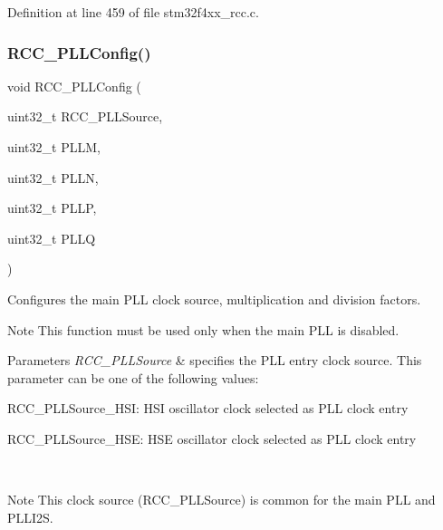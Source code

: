 Definition at line 459 of file stm32f4xx\+\_\+rcc.\+c.

\mbox{\label{group___r_c_c___group1_ga154b93e90bfdede2a874244a1ff1002e}} 
\subsubsection{\texorpdfstring{R\+C\+C\+\_\+\+P\+L\+L\+Config()}{RCC\_PLLConfig()}}
{\footnotesize\ttfamily void R\+C\+C\+\_\+\+P\+L\+L\+Config (\begin{DoxyParamCaption}\item[{uint32\+\_\+t}]{R\+C\+C\+\_\+\+P\+L\+L\+Source,  }\item[{uint32\+\_\+t}]{P\+L\+LM,  }\item[{uint32\+\_\+t}]{P\+L\+LN,  }\item[{uint32\+\_\+t}]{P\+L\+LP,  }\item[{uint32\+\_\+t}]{P\+L\+LQ }\end{DoxyParamCaption})}



Configures the main P\+LL clock source, multiplication and division factors. 

\begin{DoxyNote}{Note}
This function must be used only when the main P\+LL is disabled.
\end{DoxyNote}

\begin{DoxyParams}{Parameters}
{\em R\+C\+C\+\_\+\+P\+L\+L\+Source} & specifies the P\+LL entry clock source. This parameter can be one of the following values\+: \begin{DoxyItemize}
\item R\+C\+C\+\_\+\+P\+L\+L\+Source\+\_\+\+H\+SI\+: H\+SI oscillator clock selected as P\+LL clock entry \item R\+C\+C\+\_\+\+P\+L\+L\+Source\+\_\+\+H\+SE\+: H\+SE oscillator clock selected as P\+LL clock entry \end{DoxyItemize}
\\
\hline
\end{DoxyParams}
\begin{DoxyNote}{Note}
This clock source (R\+C\+C\+\_\+\+P\+L\+L\+Source) is common for the main P\+LL and P\+L\+L\+I2S.
\end{DoxyNote}

